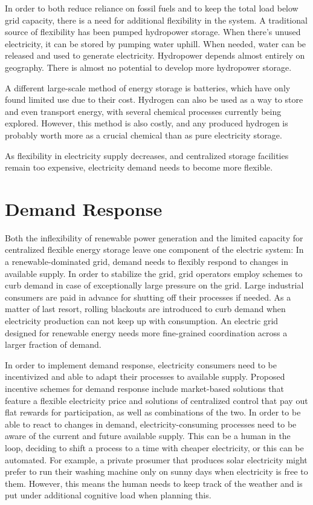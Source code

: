 In order to both reduce reliance on fossil fuels and to keep the total load below grid capacity, there is a need for additional flexibility in the system.
A traditional source of flexibility has been pumped hydropower storage.
When there's unused electricity, it can be stored by pumping water uphill.
When needed, water can be released and used to generate electricity. 
Hydropower depends almost entirely on geography. There is almost no potential to develop more hydropower storage.

A different large-scale method of energy storage is batteries, which have only found limited use due to their cost. Hydrogen can also be used as a way to store and even transport energy, with several chemical processes currently being explored.
However, this method is also costly, and any produced hydrogen is probably worth more as a crucial chemical than as pure electricity storage.

As flexibility in electricity supply decreases, and centralized storage facilities remain too expensive, electricity demand needs to become more flexible.


\section{Demand Response}
Both the inflexibility of renewable power generation and the limited capacity for centralized flexible energy storage leave one component of the electric system: In a renewable-dominated grid, demand needs to flexibly respond to changes in available supply.
In order to stabilize the grid, grid operators employ schemes to curb demand in case of exceptionally large pressure on the grid.
Large industrial consumers are paid in advance for shutting off their processes if needed.
As a matter of last resort, rolling blackouts are introduced to curb demand when electricity production can not keep up with consumption.
An electric grid designed for renewable energy needs more fine-grained coordination across a larger fraction of demand.

In order to implement demand response, electricity consumers need to be incentivized and able to adapt their processes to available supply.
Proposed incentive schemes for demand response include market-based solutions that feature a flexible electricity price and solutions of centralized control that pay out flat rewards for participation, as well as combinations of the two. 
In order to be able to react to changes in demand, electricity-consuming processes need to be aware of the current and future available supply.
This can be a human in the loop, deciding to shift a process to a time with cheaper electricity, or this can be automated.
For example, a private prosumer that produces solar electricity might prefer to run their washing machine only on sunny days when electricity is free to them.
However, this means the human needs to keep track of the weather and is put under additional cognitive load when planning this.

